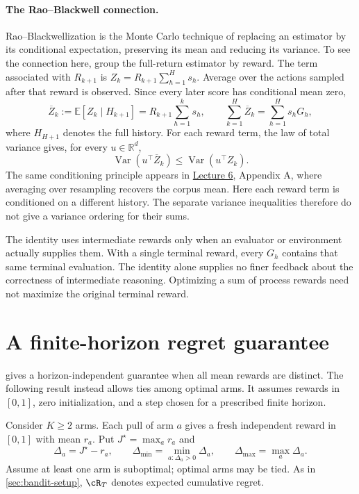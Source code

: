 \documentclass[11pt,twoside]{article}
\newcommand{\E}{\mathbb E}
\newcommand{\R}{\mathbb R}
\theoremstyle{definition}
\theoremstyle{remark}
\begin{document}
\paragraph{The Rao--Blackwell connection.}
Rao--Blackwellization is the Monte Carlo technique of replacing an estimator
by its conditional expectation, preserving its mean and reducing its
variance. To see the connection here, group the full-return estimator by
reward. The term associated with $R_{k+1}$ is
$Z_k=R_{k+1}\sum_{h=1}^H s_h$. Average over the actions sampled after that
reward is observed. Since every later score has conditional mean zero,
\[
 \overline Z_k:=\E[Z_k\mid H_{k+1}]
 =R_{k+1}\sum_{h=1}^k s_h,
 \qquad
 \sum_{k=1}^H\overline Z_k=\sum_{h=1}^H s_hG_h,
\]
where $H_{H+1}$ denotes the full history. For each reward term, the law of
total variance gives, for every $u\in\R^d$,
\[
 \operatorname{Var}(u^\top\overline Z_k)
 \leq\operatorname{Var}(u^\top Z_k).
\]
The same conditioning principle appears in
\href{lecture06.pdf}{Lecture 6}, Appendix A, where averaging over resampling
recovers the corpus mean. Here each reward term is conditioned on a
different history. The separate variance inequalities therefore do not
give a variance ordering for their sums.

The identity uses intermediate rewards only when an evaluator or environment
actually supplies them. With a single terminal reward, every $G_h$ contains
that same terminal evaluation. The identity alone supplies no finer
feedback about the correctness of intermediate reasoning. Optimizing a sum
of process rewards need not maximize the original terminal reward.

\section{A finite-horizon regret guarantee}
\label{app:small-step}

 gives a horizon-independent guarantee when all
mean rewards are distinct. The following result instead allows ties among
optimal arms. It assumes rewards in $[0,1]$, zero initialization, and a
step chosen for a prescribed finite horizon.

Consider $K\ge2$ arms. Each pull of arm $a$ gives a fresh independent reward
in $[0,1]$ with mean $r_a$. Put $J^\star=\max_a r_a$ and
\[
 \Delta_a=J^\star-r_a,\qquad
 \Delta_{\min}=\min_{a:\Delta_a>0}\Delta_a,\qquad
 \Delta_{\max}=\max_a\Delta_a.
\]
Assume at least one arm is suboptimal; optimal arms may be tied.
As in \cref{sec:bandit-setup}, $\cR_T$ denotes expected cumulative regret.
\end{document}
